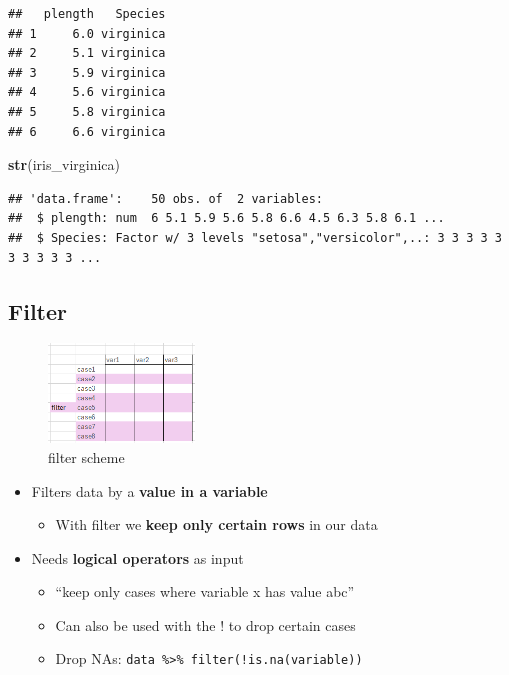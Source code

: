 \documentclass[
]{book}
\newenvironment{Shaded}{\begin{snugshade}}{\end{snugshade}}
\newcommand{\FunctionTok}[1]{\textcolor[rgb]{0.13,0.29,0.53}{\textbf{#1}}}
\newcommand{\NormalTok}[1]{#1}
\providecommand{\tightlist}{%
  \setlength{\itemsep}{0pt}\setlength{\parskip}{0pt}}
\begin{document}
\begin{verbatim}
##   plength   Species
## 1     6.0 virginica
## 2     5.1 virginica
## 3     5.9 virginica
## 4     5.6 virginica
## 5     5.8 virginica
## 6     6.6 virginica
\end{verbatim}

\begin{Shaded}
\begin{Highlighting}[]
\FunctionTok{str}\NormalTok{(iris\_virginica)}
\end{Highlighting}
\end{Shaded}

\begin{verbatim}
## 'data.frame':    50 obs. of  2 variables:
##  $ plength: num  6 5.1 5.9 5.6 5.8 6.6 4.5 6.3 5.8 6.1 ...
##  $ Species: Factor w/ 3 levels "setosa","versicolor",..: 3 3 3 3 3 3 3 3 3 3 ...
\end{verbatim}

\subsection{Filter}\label{filter}

\begin{figure}
\centering
\includegraphics[width=\textwidth,height=1.04167in]{./img/filter.png}
\caption{filter scheme}
\end{figure}

\begin{itemize}
\tightlist
\item
  Filters data by a \textbf{value in a variable}

  \begin{itemize}
  \tightlist
  \item
    With filter we \textbf{keep only certain rows} in our data
  \end{itemize}
\item
  Needs \textbf{logical operators} as input

  \begin{itemize}
  \tightlist
  \item
    ``keep only cases where variable x has value abc''
  \item
    Can also be used with the ! to drop certain cases
  \item
    Drop NAs: \texttt{data\ \%\textgreater{}\%\ filter(!is.na(variable))}
  \end{itemize}
\end{itemize}
\end{document}

